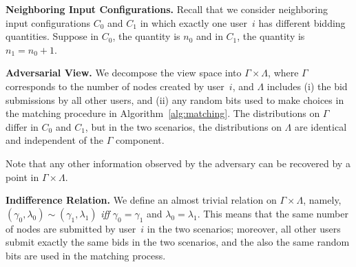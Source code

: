 
\noindent \textbf{Neighboring Input Configurations.}
Recall that we consider neighboring input configurations
$C_0$ and $C_1$ in which exactly one user~$i$ has 
different bidding quantities.
Suppose in $C_0$, the quantity is $n_0$ and
in $C_1$, the quantity is $n_1 = n_0 + 1$.


\noindent \textbf{Adversarial View.} We decompose
the view space into $\Gamma \times \Lambda$,
where $\Gamma$ corresponds to 
the number of nodes created by user~$i$,
and $\Lambda$ includes (i) the bid submissions by all other users,
and (ii) any random bits
used to make choices in the matching procedure in Algorithm~\ref{alg:matching}.
The distributions on $\Gamma$ differ in $C_0$ and $C_1$,
but in the two scenarios, the distributions on $\Lambda$ are identical
and independent of the $\Gamma$ component.

Note that any other information observed by the adversary can be recovered
by a point in $\Gamma \times \Lambda$.



\noindent \textbf{Indifference Relation.}  
We define an almost trivial relation on $\Gamma \times \Lambda$, namely,
$(\gamma_0, \lambda_0) \sim (\gamma_1, \lambda_1)$ \emph{iff}
$\gamma_0 = \gamma_1$ and $\lambda_0 = \lambda_1$.
This means that the same number of
nodes are submitted by user~$i$ in the two scenarios;
moreover, all other users submit exactly the same bids in the two scenarios,
and the also the same random bits are used in the matching process.

